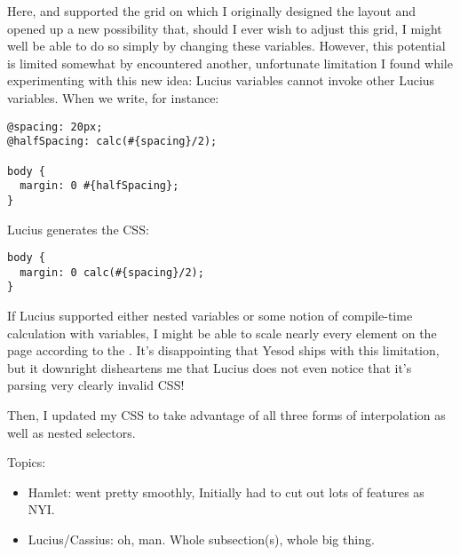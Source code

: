 Here,  and  supported the grid on which I originally designed the layout and opened up a new possibility that, should I ever wish to adjust this grid, I might well be able to do so simply by changing these variables. However, this potential is limited somewhat by encountered another, unfortunate limitation I found while experimenting with this new idea: Lucius variables cannot invoke other Lucius variables. When we write, for instance: 

\begin{Verbatim}
@spacing: 20px;
@halfSpacing: calc(#{spacing}/2);

body {
  margin: 0 #{halfSpacing};
}
\end{Verbatim}

Lucius generates the CSS:

\begin{Verbatim}
body {
  margin: 0 calc(#{spacing}/2);
}
\end{Verbatim}

If Lucius supported either nested variables or some notion of compile-time calculation with variables, I might be able to scale nearly every element on the page according to the . It's disappointing that Yesod ships with this limitation, but it downright disheartens me that Lucius does not even notice that it's parsing very clearly invalid CSS!

Then, I updated my CSS to take advantage of all three forms of interpolation as well as nested selectors.

Topics:
\begin{itemize}
  \item Hamlet: went pretty smoothly, Initially had to cut out lots of features as NYI.
  \item Lucius/Cassius: oh, man. Whole subsection(s), whole big thing.
\end{itemize}

